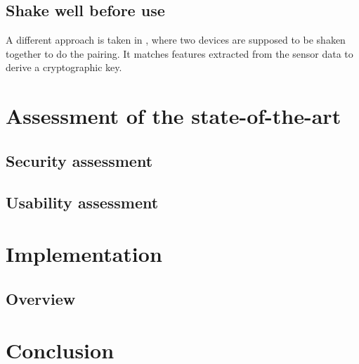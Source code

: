 \documentclass[conference, 11pt]{sty/IEEEtran}
\begin{document}
\subsection{Shake well before use}
A different approach is taken in \cite{mayrhofer2009shake}, where two devices are supposed to be shaken together to do the pairing.
It matches features extracted from the sensor data to derive a cryptographic key.

\section{Assessment of the state-of-the-art}
\label{sec:assessment_of_the_state_of_the_art}

\subsection{Security assessment}
\label{ssec:security_assessment}

\subsection{Usability assessment}
\label{ssec:usability_assessment}

\section{Implementation}
\label{sec:implementation}

\subsection{Overview}
\label{ssec:overview}

\section{Conclusion}
\label{sec:conclusion}



\end{document}
